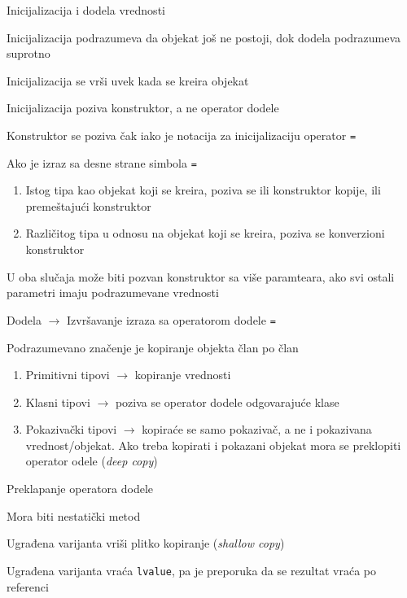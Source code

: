 \documentclass{article}
\newenvironment{xitemize}{%
    
    \itemize
    \larger
}{%
    \enditemize
}
\let\olditemize\itemize
\let\endolditemize\enditemize
\renewenvironment{itemize}{%
    \smaller
    \olditemize
}{%
    \endolditemize
}
\providecommand{\inlinecode}[1]{\texttt{#1}}
\begin{document}
\begin{xitemize}
\item Inicijalizacija i dodela vrednosti
\begin{itemize}
    \item Inicijalizacija podrazumeva da objekat još ne postoji, dok dodela podrazumeva suprotno
    \item Inicijalizacija se vrši uvek kada se kreira objekat
    \item Inicijalizacija poziva konstruktor, a ne operator dodele
    \item Konstruktor se poziva čak iako je notacija za inicijalizaciju operator \inlinecode=
    \item Ako je izraz sa desne strane simbola \inlinecode=
    \begin{enumerate}
        \item Istog tipa kao objekat koji se kreira, poziva se ili konstruktor kopije, ili premeštajući konstruktor
        \item Različitog tipa u odnosu na objekat koji se kreira, poziva se konverzioni konstruktor
    \end{enumerate}
    \item U oba slučaja može biti pozvan konstruktor sa više paramteara, ako svi ostali parametri imaju podrazumevane vrednosti
    \item Dodela $\rightarrow$ Izvršavanje izraza sa operatorom dodele \inlinecode=
    \item Podrazumevano značenje je kopiranje objekta član po član
    \begin{enumerate}
        \item Primitivni tipovi $\rightarrow$ kopiranje vrednosti
        \item Klasni tipovi $\rightarrow$ poziva se operator dodele odgovarajuće klase
        \item Pokazivački tipovi $\rightarrow$ kopiraće se samo pokazivač, a ne i pokazivana vrednost/objekat. Ako treba kopirati i pokazani objekat mora se preklopiti operator odele (\textit{deep copy})
    \end{enumerate}
\end{itemize}
\item Preklapanje operatora dodele
\begin{itemize}
    \item Mora biti nestatički metod
    \item Ugrađena varijanta vriši plitko kopiranje (\textit{shallow copy})
    \item Ugrađena varijanta vraća \inlinecode{lvalue}, pa je preporuka da se rezultat vraća po referenci

\end{itemize}
\end{xitemize}
\end{document}
